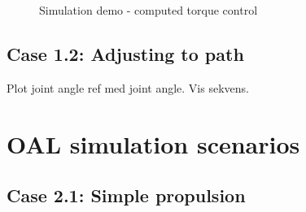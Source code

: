 \begin{figure}

    \caption{Simulation demo - computed torque control}
    \label{fig:case1-1}
\end{figure}



\subsection{Case 1.2: Adjusting to path}

Plot joint angle ref med joint angle.
Vis sekvens.



\section{OAL simulation scenarios}

\subsection{Case 2.1: Simple propulsion}


